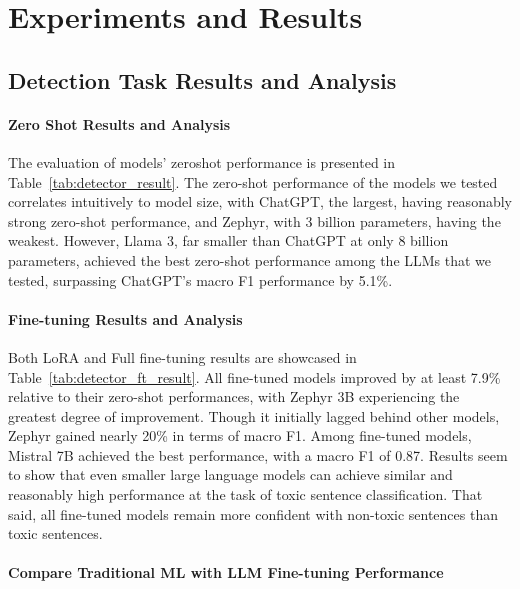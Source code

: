 \section{Experiments and Results}





\subsection{Detection Task Results and Analysis}

\paragraph{Zero Shot Results and Analysis}
The evaluation of models' zeroshot performance is presented in Table~\ref{tab:detector_result}. 
The zero-shot performance of the models we tested correlates intuitively to model size, with ChatGPT, the largest, having reasonably strong zero-shot performance, and Zephyr, with 3 billion parameters, having the weakest. However, Llama 3, far smaller than ChatGPT at only 8 billion parameters, achieved the best zero-shot performance among the LLMs that we tested, surpassing ChatGPT's macro F1 performance by 5.1\%. 

\paragraph{Fine-tuning Results and Analysis}
Both LoRA and Full fine-tuning results are showcased in Table~\ref{tab:detector_ft_result}. 
All fine-tuned models improved by at least 7.9\% relative to their zero-shot performances, with Zephyr 3B experiencing the greatest degree of improvement. Though it initially lagged behind other models, Zephyr gained nearly 20\% in terms of macro F1. Among fine-tuned models, Mistral 7B achieved the best performance, with a macro F1 of 0.87. Results seem to show that even smaller large language models can achieve similar and reasonably high performance at the task of toxic sentence classification. That said, all fine-tuned models remain more confident with non-toxic sentences than toxic sentences.



\paragraph{Compare Traditional ML with LLM Fine-tuning Performance}

